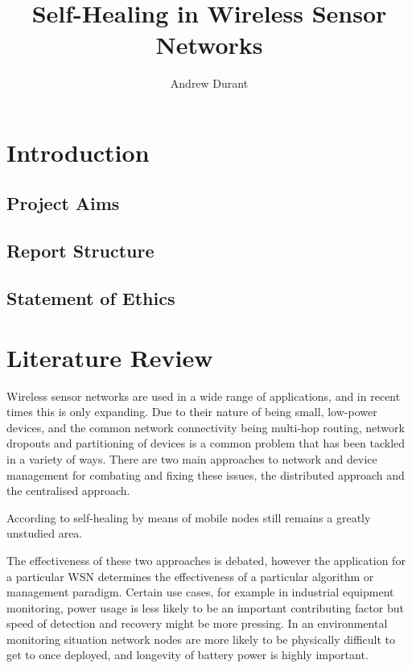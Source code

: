 \documentclass[authoryearcitations]{UoYCSproject}
\author{Andrew Durant}
\title{Self-Healing in Wireless Sensor Networks}
\begin{document}
\maketitle
\listoffigures
\listoftables
\renewcommand*{\lstlistlistingname}{List of Listings}
\lstlistoflistings

\chapter{Introduction}
\label{cha:Introduction}

\section{Project Aims}

\section{Report Structure}

\section{Statement of Ethics}

\chapter{Literature Review}
\label{cha:LitReview}

Wireless sensor networks are used in a wide range of applications, and in recent times this is only expanding. Due to their nature of being small, low-power devices, and the common network connectivity being multi-hop routing, network dropouts and partitioning of devices is a common problem that has been tackled in a variety of ways. There are two main approaches to network and device management for combating and fixing these issues, the distributed approach and the centralised approach.

According to \citet{Tong2009} self-healing by means of mobile nodes still remains a greatly unstudied area.

The effectiveness of these two approaches is debated, however the application for a particular WSN determines the effectiveness of a particular algorithm or management paradigm. Certain use cases, for example in industrial equipment monitoring, power usage is less likely to be an important contributing factor but speed of detection and recovery might be more pressing. In an environmental monitoring situation network nodes are more likely to be physically difficult to get to once deployed, and longevity of battery power is highly important.
\end{document}
